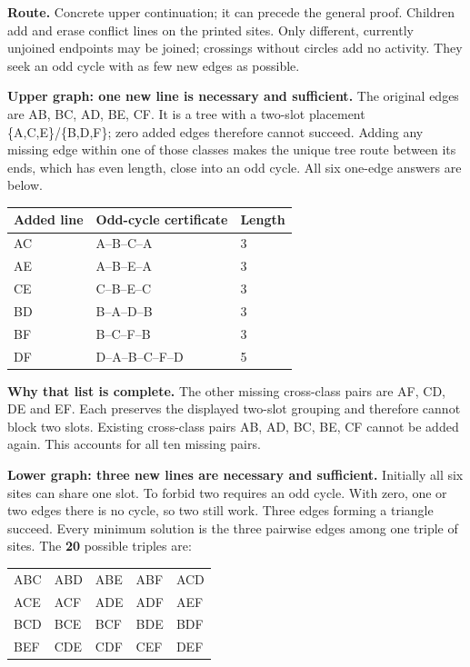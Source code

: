 \documentclass[10pt,letterpaper]{article}
\newcommand{\topic}[1]{\vspace{3pt}{\large\bfseries #1}\par}
\newcommand{\labelled}[2]{\textbf{#1} #2\par}
\newcommand{\route}[1]{\textbf{Route.} #1\par}
\begin{document}
\newpage
\topic{Student p. 6 / Problem 6: create the smallest obstruction}
\route{Concrete upper continuation; it can precede the general proof. Children add and erase conflict lines on the printed sites. Only different, currently unjoined endpoints may be joined; crossings without circles add no activity. They seek an odd cycle with as few new edges as possible.}
\labelled{Upper graph: one new line is necessary and sufficient.}{The original edges are AB, BC, AD, BE, CF. It is a tree with a two-slot placement \{A,C,E\}/\{B,D,F\}; zero added edges therefore cannot succeed. Adding any missing edge within one of those classes makes the unique tree route between its ends, which has even length, close into an odd cycle. All six one-edge answers are below.}
\begin{tabularx}{\linewidth}{@{}p{1in}Xp{1.35in}@{}}
\toprule
Added line & Odd-cycle certificate & Length \\
\midrule
AC & A--B--C--A & 3 \\
AE & A--B--E--A & 3 \\
CE & C--B--E--C & 3 \\
BD & B--A--D--B & 3 \\
BF & B--C--F--B & 3 \\
DF & D--A--B--C--F--D & 5 \\
\bottomrule
\end{tabularx}\par\smallskip
\labelled{Why that list is complete.}{The other missing cross-class pairs are AF, CD, DE and EF. Each preserves the displayed two-slot grouping and therefore cannot block two slots. Existing cross-class pairs AB, AD, BC, BE, CF cannot be added again. This accounts for all ten missing pairs.}
\labelled{Lower graph: three new lines are necessary and sufficient.}{Initially all six sites can share one slot. To forbid two requires an odd cycle. With zero, one or two edges there is no cycle, so two still work. Three edges forming a triangle succeed. Every minimum solution is the three pairwise edges among one triple of sites. The \textbf{20} possible triples are:}
\begin{center}
\begin{tabular}{@{}lllll@{}}
ABC & ABD & ABE & ABF & ACD \\
ACE & ACF & ADE & ADF & AEF \\
BCD & BCE & BCF & BDE & BDF \\
BEF & CDE & CDF & CEF & DEF
\end{tabular}
\end{center}
\end{document}
